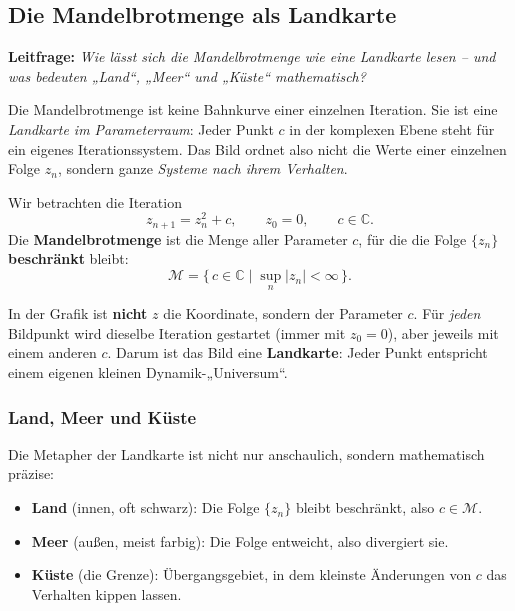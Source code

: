
\subsection{Die Mandelbrotmenge als Landkarte}
\label{sec:VII-7-3}

\textbf{Leitfrage:} \emph{Wie lässt sich die Mandelbrotmenge wie eine Landkarte lesen -- und was bedeuten „Land“, „Meer“ und „Küste“ mathematisch?}

Die Mandelbrotmenge ist keine Bahnkurve einer einzelnen Iteration.
Sie ist eine \emph{Landkarte im Parameterraum}:
Jeder Punkt \(c\) in der komplexen Ebene steht für ein eigenes Iterationssystem.
Das Bild ordnet also nicht die Werte einer einzelnen Folge \(z_n\),
sondern ganze \emph{Systeme nach ihrem Verhalten}.

\begin{MathBox}
	\label{box:landkarte}
	Wir betrachten die Iteration
	\[
	z_{n+1}=z_n^2+c,\qquad z_0=0,\qquad c\in\mathbb{C}.
	\]
	Die \textbf{Mandelbrotmenge} ist die Menge aller Parameter \(c\),
	für die die Folge \(\{z_n\}\) \textbf{beschränkt} bleibt:
	\[
	\mathcal{M}=\{\,c\in\mathbb{C}\mid \sup_n |z_n|<\infty\,\}.
	\]
\end{MathBox}

\begin{DidacticBox}
	\label{box:denkfehler}
	In der Grafik ist \textbf{nicht} \(z\) die Koordinate,
	sondern der Parameter \(c\).
	Für \emph{jeden} Bildpunkt wird dieselbe Iteration gestartet
	(immer mit \(z_0=0\)),
	aber jeweils mit einem anderen \(c\).
	Darum ist das Bild eine \textbf{Landkarte}:
	Jeder Punkt entspricht einem eigenen kleinen Dynamik-„Universum“.
\end{DidacticBox}

\subsubsection*{Land, Meer und Küste}

Die Metapher der Landkarte ist nicht nur anschaulich,
sondern mathematisch präzise:

\begin{itemize}
	\item \textbf{Land} (innen, oft schwarz): Die Folge \(\{z_n\}\) bleibt beschränkt, also \(c\in\mathcal{M}\).
	\item \textbf{Meer} (außen, meist farbig): Die Folge entweicht, also divergiert sie.
	\item \textbf{Küste} (die Grenze): Übergangsgebiet, in dem kleinste Änderungen von \(c\) das Verhalten kippen lassen.
\end{itemize}

